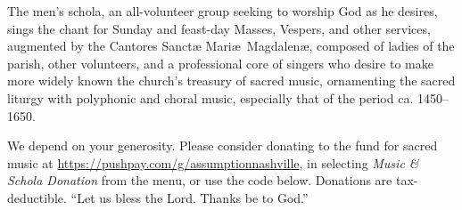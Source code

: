The men's schola, an all-volunteer group seeking to worship God as he desires, sings the chant for Sunday and feast-day Masses, Vespers, and other services, augmented by the Cantores Sanctæ Mariæ Magdalenæ, composed of ladies of the parish, other volunteers, and a professional core of singers who desire to make more widely known the church's treasury of sacred music, ornamenting the sacred liturgy with polyphonic and choral music, especially that of the period ca. 1450--1650.

We depend on your generosity. Please consider donating to the fund for sacred music at 
\url{https://pushpay.com/g/assumptionnashville}, in selecting \emph{Music \& Schola Donation} from the menu, or use the  code below. Donations are tax-deductible. ``Let us bless the Lord. Thanks be to God.''

